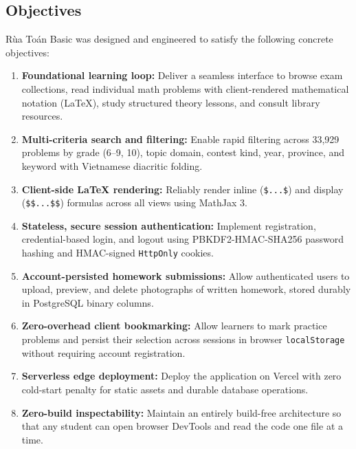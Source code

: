 \subsection{Objectives}
Rùa Toán Basic was designed and engineered to satisfy the following concrete objectives:
\begin{enumerate}[label=O\arabic*.]
  \item \textbf{Foundational learning loop:} Deliver a seamless interface to browse exam collections, read
        individual math problems with client-rendered mathematical notation (LaTeX), study structured theory
        lessons, and consult library resources.
  \item \textbf{Multi-criteria search and filtering:} Enable rapid filtering across 33,929 problems by grade (6--9, 10),
        topic domain, contest kind, year, province, and keyword with Vietnamese diacritic folding.
  \item \textbf{Client-side LaTeX rendering:} Reliably render inline (\texttt{\$...\$}) and display
        (\texttt{\$\$...\$\$}) formulas across all views using MathJax 3.
  \item \textbf{Stateless, secure session authentication:} Implement registration, credential-based login,
        and logout using PBKDF2-HMAC-SHA256 password hashing and HMAC-signed \texttt{HttpOnly} cookies.
  \item \textbf{Account-persisted homework submissions:} Allow authenticated users to upload, preview, and
        delete photographs of written homework, stored durably in PostgreSQL binary columns.
  \item \textbf{Zero-overhead client bookmarking:} Allow learners to mark practice problems and persist their
        selection across sessions in browser \texttt{localStorage} without requiring account registration.
  \item \textbf{Serverless edge deployment:} Deploy the application on Vercel with zero cold-start penalty for
        static assets and durable database operations.
  \item \textbf{Zero-build inspectability:} Maintain an entirely build-free architecture so that any student can
        open browser DevTools and read the code one file at a time.
\end{enumerate}


